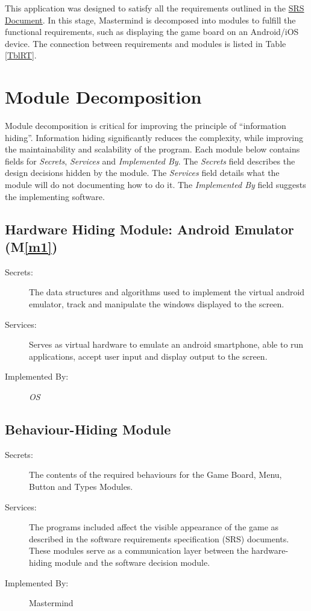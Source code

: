 \documentclass[12pt, titlepage]{article}
\newcommand{\mref}[1]{M\ref{#1}}
\begin{document}
This application was designed to satisfy all the requirements outlined in
the \href{https://gitlab.cas.mcmaster.ca/rosnej1/open-mastermind/-/blob/master/Doc/SRS/SRS.pdf}{SRS Document}. In this stage, Mastermind is decomposed into modules to fulfill the functional requirements, such as displaying the game board on an Android/iOS device. The connection between requirements and modules is listed in Table \ref{TblRT}.

\section{Module Decomposition} \label{SecMD}

Module decomposition is critical for improving the principle of ``information hiding''. Information hiding significantly reduces the complexity, while improving the maintainability and scalability of the program. Each module below contains fields for \emph{Secrets}, \emph{Services} and \emph{Implemented By}.   The \emph{Secrets} field describes the design decisions hidden by the module. The \emph{Services} field details what the module will do not documenting how to do it. The \emph{Implemented By} field suggests the implementing software. 


\subsection{Hardware Hiding Module: Android Emulator (\mref{m1})}

\begin{description}
\item[Secrets:] The data structures and algorithms used to implement the virtual
  android emulator, track and manipulate the windows displayed to the screen.
\item[Services:] Serves as virtual hardware to emulate an android smartphone, able to run applications, accept user input and display output to the screen.
\item[Implemented By:]  \emph{OS}
\end{description}

\subsection{Behaviour-Hiding Module}

\begin{description}
\item[Secrets:]The contents of the required behaviours for the Game Board, Menu, Button and Types Modules.
\item[Services:]The programs included affect the visible appearance of the game as described in the software requirements specification (SRS)
  documents. These modules serve as a communication layer between the
  hardware-hiding module and the software decision module.
\item[Implemented By:] Mastermind
\end{description}
\end{document}
